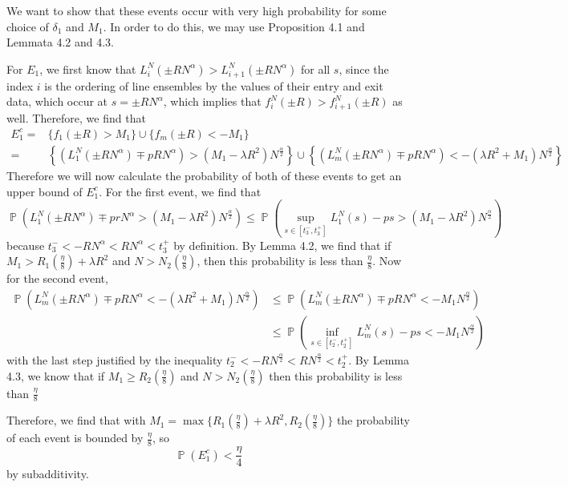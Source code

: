 \documentclass[12pt]{article}
\DeclareMathOperator{\pr}{\mathbb{P}}
\begin{document}
We want to show that these events occur with very high probability for some choice of $\delta_1$ and $M_1$. In order to do this, we may use Proposition 4.1 and Lemmata 4.2 and 4.3. 

For $E_1$,  we first know that $L_i^N(\pm RN^\alpha)> L_{i+1}^N(\pm RN^\alpha)$ for all $s$, since the index $i$ is the ordering of line ensembles by the values of their entry and exit data, which occur at $s=\pm RN^\alpha$, which implies that $f_i^N(\pm R)>f_{i+1}^N(\pm R)$ as well. Therefore, we find that
\begin{align*}
E_1^c=&\{f_1(\pm R)> M_1\} \cup \{f_m(\pm R)<-M_1\} \\
=&\left\{ \left(L_1^N(\pm RN^\alpha)\mp pRN^\alpha\right)> (M_1-\lambda R^2)N^{\frac \alpha 2}\right\} \cup \left\{\left(L_m^N(\pm RN^\alpha)\mp pRN^\alpha\right)< -(\lambda R^2+M_1)N^{\frac\alpha 2}\right\}
\end{align*}
Therefore we will now calculate the probability of both of these events to get an upper bound of $E_1^c$. For the first event, we find that $$
\pr\left(L_1^N(\pm RN^\alpha)\mp prN^\alpha>(M_1-\lambda R^2)N^{\frac\alpha2}\right)
\leq\pr\left(\sup_{s\in[t_3^-,t_3^+]}L_1^N(s)-ps>(M_1-\lambda R^2)N^{\frac\alpha 2}\right)
$$ because $t_3^-<-RN^\alpha<RN^\alpha<t_3^+$ by definition. By Lemma 4.2, we find that if $M_1>R_1(\frac{\eta}{8})+\lambda R^2$ and $N>N_2(\frac\eta 8)$, then this probability is less than $\frac\eta 8$.
Now for the second event, \begin{align*}
\pr \left(L_m^N(\pm RN^\alpha)\mp pRN^\alpha< -(\lambda R^2+M_1)N^{\frac\alpha 2}\right)&\leq \pr \left(L_m^N(\pm RN^\alpha)\mp pRN^\alpha< -M_1N^{\frac\alpha 2}\right)\\
&\leq \pr\left(\inf_{s\in[t_2^-,t_2^+]}L_m^N(s)-ps<-M_1N^{\frac{\alpha}{2}}\right)
\end{align*}
with the last step justified by the inequality $t_2^-<-RN^{\frac{\alpha}{2}}<RN^{\frac{\alpha}{2}}<t_2^+$. By Lemma 4.3, we know that if $M_1\geq R_2(\frac{\eta}{8})$ and $N>N_2(\frac{\eta}{8})$ then this probability is less than $\frac{\eta}{8}$

Therefore, we find that with $M_1=\max\{R_1(\frac{\eta}{8})+\lambda R^2,R_2(\frac\eta8)\}$ the probability of each event is bounded by $\frac{\eta}8$, so $$\pr(E_1^c)<\frac{\eta}{4}$$ by subadditivity.
\end{document}
